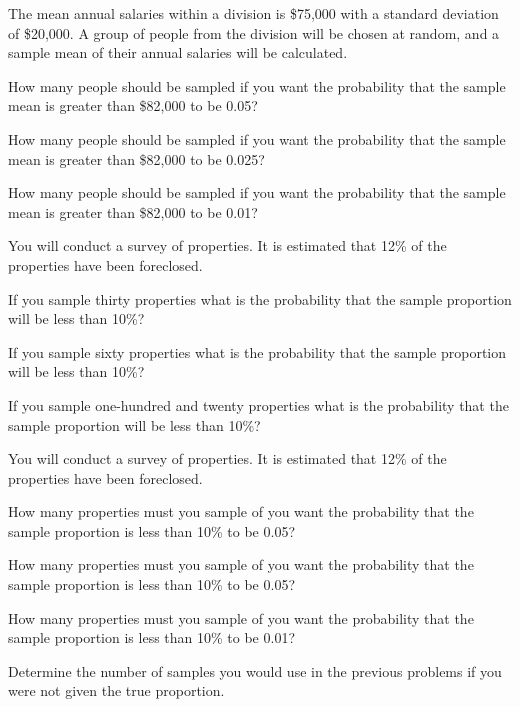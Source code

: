 \begin{problem}
    \item The mean annual salaries within a division is \$75,000 with a
    standard deviation of \$20,000. A group of people from the
    division will be chosen at random, and a sample mean of their
    annual salaries will be calculated.
    \begin{subproblem}
    \item How many people should be sampled if you want the
      probability that the sample mean is greater than \$82,000 to be
      0.05?

      \vfill

    \item How many people should be sampled if you want the
      probability that the sample mean is greater than \$82,000 to be
      0.025?

      \vfill

    \item How many people should be sampled if you want the
      probability that the sample mean is greater than \$82,000 to be
      0.01?

      \vfill

    \end{subproblem}

    \clearpage

\item You will conduct a survey of properties. It is estimated that
  12\% of the properties have been foreclosed. 
  \begin{subproblem}
  \item If you sample thirty properties what is the probability that
    the sample proportion will be less than 10\%?
    \vfill
  \item If you sample  sixty properties what is the probability that
    the sample proportion will be less than 10\%?
    \vfill
  \item If you sample one-hundred and twenty properties what is the
    probability that the sample proportion will be less than 10\%?
    \vfill
  \end{subproblem}

\clearpage

\item You will conduct a survey of properties. It is estimated that
  12\% of the properties have been foreclosed. 
  \begin{subproblem}
  \item How many properties must you sample of you want the
    probability that the sample proportion is less than 10\% to be
    0.05?
    \vfill
  \item How many properties must you sample of you want the
    probability that the sample proportion is less than 10\% to be
    0.05?
    \vfill
  \item How many properties must you sample of you want the
    probability that the sample proportion is less than 10\% to be
    0.01?
    \vfill

  \item Determine the number of samples you would use in the previous
    problems if you were not given the true proportion.
  \end{subproblem}


\end{problem}
